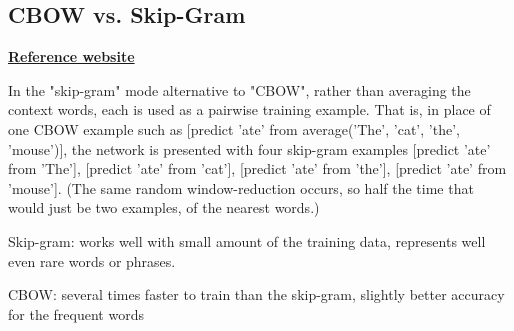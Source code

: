 \documentclass[12pt]{article}
\begin{document}
\subsection{CBOW vs. Skip-Gram}
\href{https://stackoverflow.com/questions/38287772/cbow-v-s-skip-gram-why-invert-context-and-target-words#}{\textbf{Reference website}}
\par In the "skip-gram" mode alternative to "CBOW", rather than averaging the context words, each is used as a pairwise training example. That is, in place of one CBOW example such as [predict 'ate' from average('The', 'cat', 'the', 'mouse')], the network is presented with four skip-gram examples [predict 'ate' from 'The'], [predict 'ate' from 'cat'], [predict 'ate' from 'the'], [predict 'ate' from 'mouse']. (The same random window-reduction occurs, so half the time that would just be two examples, of the nearest words.)
\ulb
\item Skip-gram: works well with small amount of the training data, represents well even rare words or phrases.
\item CBOW: several times faster to train than the skip-gram, slightly better accuracy for the frequent words
\ule
\end{document}
